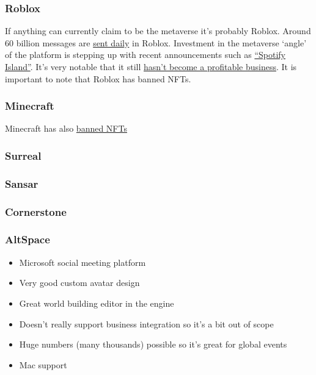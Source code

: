 \subsubsection{Roblox}
If anything can currently claim to be the metaverse it's probably Roblox. Around 60 billion messages are \href{https://podcasts.apple.com/us/podcast/developments-investments-experiences-in-the-metaverse/id1593908027?i=1000540906629}{sent daily} in Roblox. Investment in the metaverse `angle' of the platform is stepping up with recent announcements such as \href{https://techcrunch.com/2022/05/03/spotify-becomes-first-music-streamer-to-launch-on-roblox/?}{``Spotify Island''}. It's very notable that it still \href{https://fortune.com/2022/06/03/roblox-gaming-ecosystem-metaverse-stocks-profit/}{hasn't become a profitable business}. It is important to note that Roblox has banned NFTs.

\subsubsection{Minecraft}
Minecraft has also \href{https://www.minecraft.net/en-us/article/minecraft-and-nfts}{banned NFTs}
\subsubsection{Surreal}
\subsubsection{Sansar}
\subsubsection{Cornerstone}
\subsubsection{AltSpace}
\begin{itemize}
\item Microsoft social meeting platform
\item Very good custom avatar design
\item Great world building editor in the engine
\item Doesn't really support business integration so it's a bit out of scope
\item Huge numbers (many thousands) possible so it's great for global events
\item Mac support
\end{itemize}

